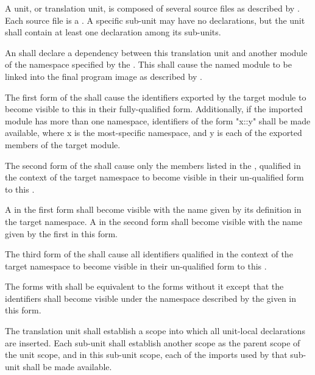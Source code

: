 \specsubitem
A unit, or translation unit, is composed of several source files as described
by . Each source file is a .
A specific sub-unit may have no declarations, but the unit shall contain at
least one declaration among its sub-units.

\specsubitem
An  shall declare a dependency between this translation
unit and another module of the namespace specified by the
 . This shall cause the named
module to be linked into the final program image as described by
.

\specsubitem
The first form of the  shall cause the identifiers
exported by the target module to become visible to this 
in their fully-qualified form. Additionally, if the imported module has more
than one namespace, identifiers of the form "x::y" shall be made available,
where x is the most-specific namespace, and y is each of the exported members
of the target module.

\specsubitem
The second form of the  shall cause only the members
listed in the , qualified in the context of the target
namespace to become visible in their un-qualified form to this
.

\specsubitem
A  in the first form shall become visible with the name
given by its definition in the target namespace. A  in the
second form shall become visible with the name given by the first
 in this form.


\specsubitem
The third form of the  shall cause all identifiers
qualified in the context of the target namespace to become visible in their
un-qualified form to this .

\specsubitem
The forms with  shall be equivalent to the forms without
it except that the identifiers shall become visible under the namespace
described by the  given in this form.


\specsubitem
The translation unit shall establish a scope into which all
unit-local declarations are inserted. Each sub-unit shall establish another
scope as the parent scope of the unit scope, and in this sub-unit
scope, each of the imports used by that sub-unit shall be made available.


